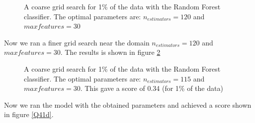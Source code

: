 \documentclass[a4paper,12pt]{article}
\begin{document}
\begin{figure}[H]
\hfill
{}
\hfill
\caption{A coarse grid search for 1\% of the data with the Random Forest classifier. The optimal parameters are: $n_{estimators}=120$ and $max{features}=30$}
\label{Q41b}
\end{figure}

Now we ran a finer grid search near the domain  $n_{estimators}=120$ and $max{features}=30$. The results is shown in figure \ref{Q41c}
\begin{figure}[H]
\hfill
{}
\hfill
\caption{A coarse grid search for 1\% of the data with the Random Forest classifier. The optimal parameters are: $n_{estimators}=115$ and $max{features}=30$. This gave a score of 0.34 (for 1\% of the data)}
\label{Q41c}
\end{figure}
Now we ran the model with the obtained parameters and achieved a score shown in figure \ref{Q41d}.
\end{document}
